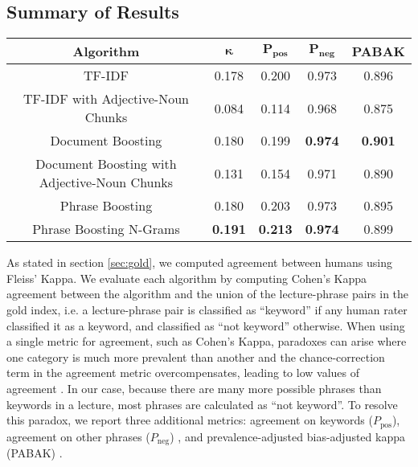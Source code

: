 \subsection{Summary of Results}
\label{sec:sum}



\begin{figure*}[!ht]
\caption{}
\label{fig:main_result}
\begin{tabular}{|c|c|c|c|c|}
\hline
\textbf{Algorithm} & $\mathbf{\kappa}$ & $\mathbf{P_{\text{pos}}}$ & $\mathbf{P_{\text{neg}}}$ & \textbf{PABAK} \\
\hline
TF-IDF & 0.178 & 0.200 & 0.973 & 0.896 \\
\hline
TF-IDF with Adjective-Noun Chunks & 0.084 & 0.114 & 0.968 & 0.875 \\
\hline
Document Boosting & 0.180 & 0.199 & \textbf{0.974} & \textbf{0.901} \\
\hline
Document Boosting with Adjective-Noun Chunks & 0.131 & 0.154 & 0.971 & 0.890 \\
\hline
Phrase Boosting & 0.180 & 0.203 & 0.973 & 0.895 \\
\hline
Phrase Boosting N-Grams & \textbf{0.191} & \textbf{0.213} & \textbf{0.974} & 0.899 \\
\hline
\end{tabular}
\end{figure*}

As stated in section \ref{sec:gold}, we computed agreement between humans using Fleiss' Kappa. We evaluate each algorithm by computing Cohen's Kappa agreement between the algorithm and the union of the lecture-phrase pairs in the gold index, i.e. a lecture-phrase pair is classified as ``keyword'' if any human rater classified it as a keyword, and classified as ``not keyword'' otherwise. When using a single metric for agreement, such as Cohen's Kappa, paradoxes can arise where one category is much more prevalent than another and the chance-correction term in the agreement metric overcompensates, leading to low values of agreement \cite{feinstein1990high}. In our case, because there are many more possible phrases than keywords in a lecture, most phrases are calculated as ``not keyword''. To resolve this paradox, we report three additional metrics: agreement on keywords ($P_{\text{pos}}$), agreement on other phrases ($P_{\text{neg}}$) \cite{cicchetti1990high}, and prevalence-adjusted bias-adjusted kappa (PABAK) \cite{byrt1993bias}.

